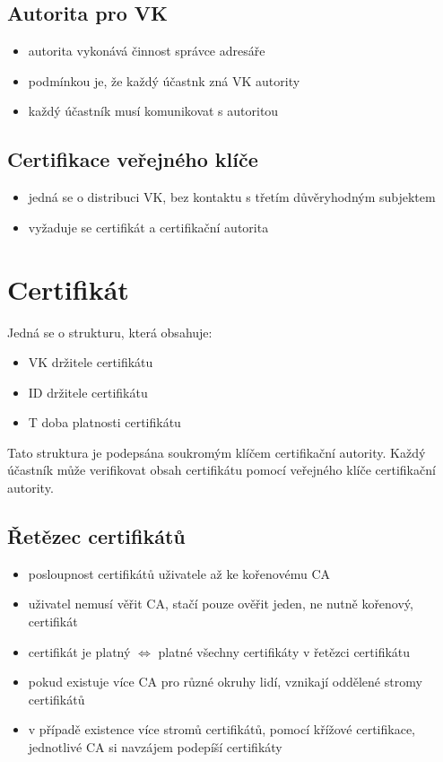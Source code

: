 \documentclass{szzclass}
\begin{document}
\subsection{Autorita pro VK}
\begin{itemize}
  \item autorita vykonává činnost správce adresáře
  \item podmínkou je, že každý účastnk zná VK autority
  \item každý účastník musí komunikovat s autoritou
\end{itemize}
\subsection{Certifikace veřejného klíče}
\begin{itemize}
  \item jedná se o distribuci VK, bez kontaktu s třetím důvěryhodným subjektem
  \item vyžaduje se certifikát a certifikační autorita
\end{itemize}
\section{Certifikát}
Jedná se o strukturu, která obsahuje:
\begin{itemize}
  \item VK držitele certifikátu
  \item ID držitele certifikátu
  \item T doba platnosti certifikátu
\end{itemize}
Tato struktura je podepsána soukromým klíčem certifikační autority. Každý účastník může verifikovat obsah certifikátu pomocí veřejného
klíče certifikační autority.
\subsection{Řetězec certifikátů}
\begin{itemize}
  \item posloupnost certifikátů uživatele až ke kořenovému CA
  \item uživatel nemusí věřit CA, stačí pouze ověřit jeden, ne nutně kořenový, certifikát
  \item certifikát je platný $\Leftrightarrow$ platné všechny certifikáty v řetězci certifikátu
  \item pokud existuje více CA pro různé okruhy lidí, vznikají oddělené stromy certifikátů
  \item v případě existence více stromů certifikátů, pomocí křížové certifikace, jednotlivé CA si navzájem podepíší certifikáty
\end{itemize}
\end{document}
